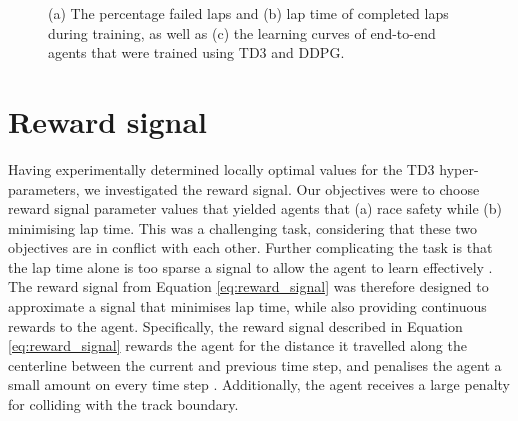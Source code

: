 \begin{figure}[htb!]
    \centering
    
    \caption[Learning curves showing for agents trained using TD3 and DDPG]{(a) The percentage failed laps and (b) lap time of completed laps during training, as well as (c) the learning curves of end-to-end agents that were trained using TD3 and DDPG.}
    \label{fig:learning_method}
\end{figure}








\section{Reward signal}

Having experimentally determined locally optimal values for the TD3 hyper-parameters, we investigated the reward signal.
Our objectives were to choose reward signal parameter values that yielded agents that (a) race safety while (b) minimising lap time.
This was a challenging task, considering that these two objectives are in conflict with each other.
Further complicating the task is that the lap time alone is too sparse a signal to allow the agent to learn effectively \cite{Perot2017, Jaritz2018}.
The reward signal from Equation \ref{eq:reward_signal} was therefore designed to approximate a signal that minimises lap time, while also providing continuous rewards to the agent.
Specifically, the reward signal described in Equation \ref{eq:reward_signal} rewards the agent for the distance it travelled along the centerline between the current and previous time step, and penalises the agent a small amount on every time step \cite{Fuchs2021}. 
Additionally, the agent receives a large penalty for colliding with the track boundary. 


